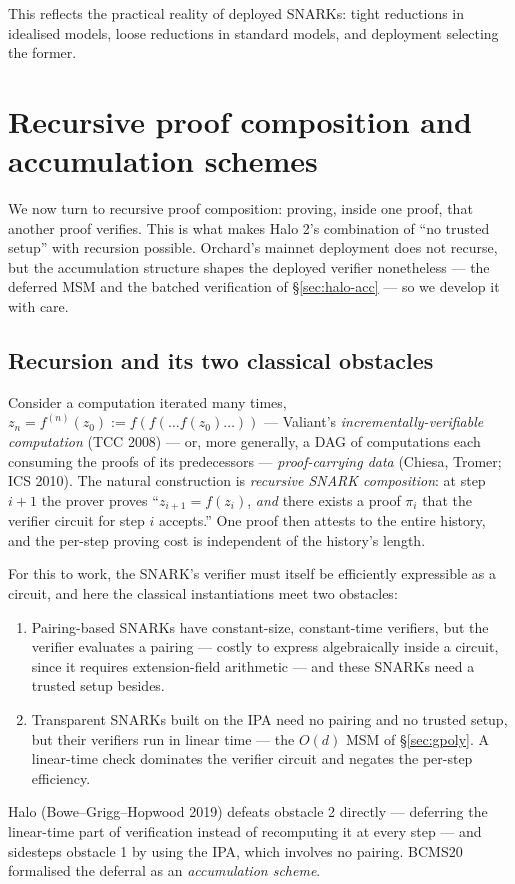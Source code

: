 \documentclass[11pt,a4paper]{article}
\theoremstyle{definition}
\begin{document}
This reflects the practical reality of deployed SNARKs: tight reductions
in idealised models, loose reductions in standard models, and deployment
selecting the former.

\section{Recursive proof composition and accumulation schemes}\label{sec:pcd}

We now turn to recursive proof composition: proving, inside one proof,
that another proof verifies. This is what makes Halo 2's combination of
``no trusted setup'' with recursion possible. Orchard's mainnet
deployment does not recurse, but the accumulation structure shapes the
deployed verifier nonetheless --- the deferred MSM and the batched
verification of \S\ref{sec:halo-acc} --- so we develop it with care.

\subsection{Recursion and its two classical obstacles}

Consider a computation iterated many times,
$z_n = f^{(n)}(z_0) := f(f(\dots f(z_0) \dots))$ --- Valiant's
\emph{incrementally-verifiable computation} (TCC 2008) --- or, more
generally, a DAG of computations each consuming the proofs of its
predecessors --- \emph{proof-carrying data} (Chiesa, Tromer; ICS 2010).
The natural construction is \emph{recursive SNARK composition}: at step
$i + 1$ the prover proves ``$z_{i+1} = f(z_i)$, \emph{and} there exists
a proof $\pi_i$ that the verifier circuit for step $i$ accepts.'' One
proof then attests to the entire history, and the per-step proving cost
is independent of the history's length.

For this to work, the SNARK's verifier must itself be efficiently
expressible as a circuit, and here the classical instantiations meet two
obstacles:
\begin{enumerate}[leftmargin=*]
\item Pairing-based SNARKs have constant-size, constant-time verifiers,
but the verifier evaluates a pairing --- costly to express algebraically
inside a circuit, since it requires extension-field arithmetic --- and
these SNARKs need a trusted setup besides.
\item Transparent SNARKs built on the IPA need no pairing and no trusted
setup, but their verifiers run in linear time --- the $O(d)$ MSM of
\S\ref{sec:gpoly}. A linear-time check dominates the verifier circuit
and negates the per-step efficiency.
\end{enumerate}
Halo (Bowe--Grigg--Hopwood 2019) defeats obstacle 2 directly ---
deferring the linear-time part of verification instead of recomputing it
at every step --- and sidesteps obstacle 1 by using the IPA, which
involves no pairing. BCMS20 formalised the deferral as an
\emph{accumulation scheme}.
\end{document}
